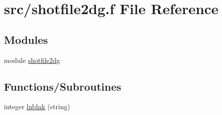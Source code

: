 \hypertarget{shotfile2dg_8f}{
\section{src/shotfile2dg.f File Reference}
\label{shotfile2dg_8f}
}
\subsection*{Modules}
\begin{CompactItemize}
\item 
module \hyperlink{namespaceshotfile2dg}{shotfile2dg}
\end{CompactItemize}
\subsection*{Functions/Subroutines}
\begin{CompactItemize}
\item 
integer \hyperlink{shotfile2dg_8f_a264a21cc4ba4bb23418babedd386991}{lnblnk} (string)
\end{CompactItemize}
